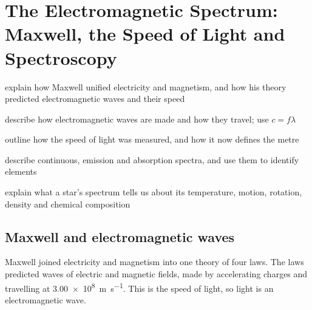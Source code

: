 \chapter[The Electromagnetic Spectrum]{The Electromagnetic Spectrum: Maxwell, the Speed of Light and Spectroscopy}\label{ch1:chap}



\begin{goals}
  \item explain how Maxwell unified electricity and magnetism, and how his theory predicted
        electromagnetic waves and their speed
  \item describe how electromagnetic waves are made and how they travel; use $c = f\lambda$
  \item outline how the speed of light was measured, and how it now defines the metre
  \item describe continuous, emission and absorption spectra, and use them to identify elements
  \item explain what a star's spectrum tells us about its temperature, motion, rotation,
        density and chemical composition
\end{goals}

\section{Maxwell and electromagnetic waves}\label{ch1:sec:maxwell}

\begin{bigidea}
Maxwell joined electricity and magnetism into one theory of four laws. The laws predicted waves
of electric and magnetic fields, made by accelerating charges and travelling at
\qty{3.00e8}{m.s^{-1}}. This is the speed of light, so light is an electromagnetic wave.
\end{bigidea}

